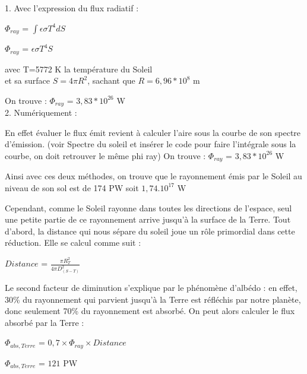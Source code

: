 \documentclass[a4paper, 12pt]{report} %
\begin{document}
1. Avec l'expression du flux radiatif :
\begin{center}
$\Phi_{ray}$ = $\int \epsilon \sigma T^{4} dS$    
\end{center}
\begin{center}
$\Phi_{ray}$ = $\epsilon \sigma T^{4} S$    
\end{center}
avec T=5772 K la température du Soleil \\
et sa surface $S=4 \pi R^{2}$, sachant que $R= 6,96*10^{8}$ m 
\vspace{\baselineskip}

\noindent On trouve :
$\Phi_{ray}$ = $3,83*10^{26}$ W  \\

2. Numériquement : \vspace{\baselineskip}

En effet évaluer le flux émit revient à calculer l'aire sous la courbe de son spectre d'émission. (voir Spectre du soleil et insérer 
le code pour faire l'intégrale sous la courbe, on doit retrouver le même phi ray) \vspace{\baselineskip}
\newline On trouve :
$\Phi_{ray}$ = $3,83*10^{26}$ W \vspace{\baselineskip}

Ainsi avec ces deux méthodes, on trouve que le rayonnement émis par le Soleil au niveau de son sol
est de 174 PW  soit $1,74.10^{17}$ W \vspace{\baselineskip}
\vspace{\baselineskip}
\vspace{\baselineskip}


Cependant, comme le Soleil rayonne dans toutes les directions de l’espace, seul une petite partie de ce rayonnement arrive jusqu’à la surface de la Terre. 
Tout d’abord, la distance qui nous sépare du soleil joue un rôle primordial dans cette réduction. 
\newline Elle se calcul comme suit :
\begin{center}
$Distance$ = $\frac{\pi R_T^{2}}{4 \pi D_{(S-T)}^{2}}$    
\end{center}

Le second facteur de diminution s’explique par le phénomène d’albédo : en effet, 30\% du rayonnement qui parvient jusqu’à la Terre est réfléchis par notre planète, donc seulement 70\% du rayonnement est absorbé. 
\newline On peut alors calculer le flux absorbé par la Terre : 
\begin{center}
$\Phi_{abs,Terre}$ = $0,7 \times \Phi_{ray} \times Distance$    
\end{center}
\begin{center}
$\Phi_{abs,Terre}$ = $121$ PW    
\end{center}
\end{document}
